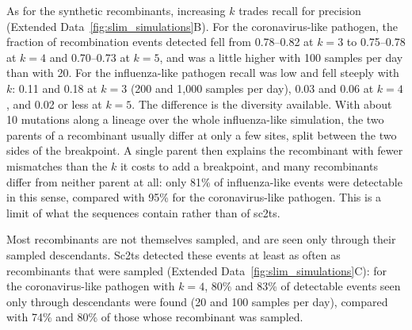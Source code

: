 \documentclass[12pt]{article}
\newcommand{\edref}[1]{Extended Data~\ref{#1}}
\begin{document}
As for the synthetic recombinants, increasing $k$ trades recall for precision
(\edref{fig:slim_simulations}B).
For the coronavirus-like pathogen, the fraction of recombination events detected
fell from 0.78--0.82 at $k=3$ to 0.75--0.78 at $k=4$ and 0.70--0.73 at $k=5$,
and was a little higher with 100 samples per day than with 20.
For the influenza-like pathogen recall was low and fell steeply with $k$:
0.11 and 0.18 at $k=3$ (200 and 1,000 samples per day),
0.03 and 0.06 at $k=4$, and 0.02 or less at $k=5$.
The difference is the diversity available.
With about 10 mutations along a lineage over the whole influenza-like simulation,
the two parents of a recombinant usually differ at only a few sites,
split between the two sides of the breakpoint.
A single parent then explains the recombinant with fewer mismatches than
the $k$ it costs to add a breakpoint,
and many recombinants differ from neither parent at all:
only 81\% of influenza-like events were detectable in this sense,
compared with 95\% for the coronavirus-like pathogen.
This is a limit of what the sequences contain rather than of sc2ts.

Most recombinants are not themselves sampled,
and are seen only through their sampled descendants.
Sc2ts detected these events at least as often as recombinants that were sampled
(\edref{fig:slim_simulations}C):
for the coronavirus-like pathogen with $k=4$,
80\% and 83\% of detectable events seen only through descendants were found
(20 and 100 samples per day), compared with 74\% and 80\% of those
whose recombinant was sampled.
\end{document}
